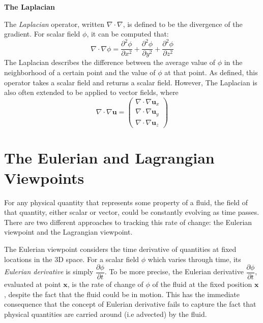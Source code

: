 \gapM

\textbf{The Laplacian}

\gapS

The \textit{Laplacian} operator, written $\nabla \cdot \nabla$, is defined to be the divergence of the gradient. For scalar field $\phi$, it can be computed that:
$$
\nabla \cdot \nabla \phi = 
\frac{\partial ^2 \phi}{\partial x^2}+
\frac{\partial ^2 \phi}{\partial y^2}+
\frac{\partial ^2 \phi}{\partial z^2}
$$
The Laplacian describes the difference between the average value of $\phi$ in the neighborhood of a certain point and the value of $\phi$ at that point. As defined, this operator takes a scalar field and returns a scalar field. However, The Laplacian is also often extended to be applied to vector fields, where 
$$
\nabla \cdot \nabla \textbf{u} =
    \begin{pmatrix}
        \nabla \cdot \nabla \textbf{u}_x \\
        \nabla \cdot \nabla \textbf{u}_y \\
        \nabla \cdot \nabla \textbf{u}_z
    \end{pmatrix}
$$


\section{The Eulerian and Lagrangian Viewpoints}

For any physical quantity that represents some property of a fluid, the field of that quantity, either scalar or vector, could be constantly evolving as time passes. There are two different approaches to tracking this rate of change: the Eulerian viewpoint and the Lagrangian viewpoint.

The Eulerian viewpoint considers the time derivative of quantities at fixed locations in the 3D space. For a scalar field $\phi$ which varies through time, its \textit{Eulerian derivative} is simply $\dfrac{\partial \phi}{\partial t}$. To be more precise, the Eulerian derivative $\dfrac{\partial \phi}{\partial t}$, evaluated at point $\textbf{x}$, is the rate of change of $\phi$ of the fluid at the fixed position $\textbf{x}$, despite the fact that the fluid could be in motion. This has the immediate consequence that the concept of Eulerian derivative fails to capture the fact that physical quantities are carried around (i.e advected) by the fluid. 

